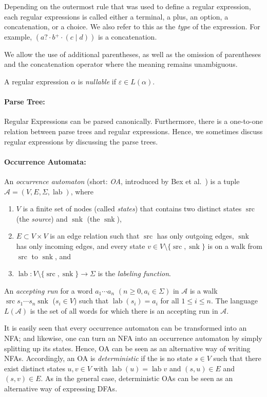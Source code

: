 \documentclass[a4paper,11pt, svgnames,titlepage]{article}
\newcommand{\rxp}{{^\mathtt{+}}}
\newcommand{\rxo}{\mathtt{?}}
\newcommand{\rxc}{\cdot}
\DeclareMathOperator{\ror}{\mathtt{|}}
\newcommand{\emptyword}{\varepsilon}
\DeclareMathOperator{\lab}{lab}
\DeclareMathOperator{\src}{src}
\DeclareMathOperator{\snk}{snk}
\begin{document}
Depending on the outermost rule that was used to define a regular expression, each regular expressions is called either a terminal, a plus, an option, a concatenation, or a choice. We also refer to this as the \emph{type} of the expression. For example, $(a\rxo \rxc b\rxp \rxc (c\ror d))$ is a concatenation.

We allow the use of additional parentheses, as well as the omission of parentheses and the concatenation operator where the meaning remains unambiguous.

A regular expression $\alpha$ is \emph{nullable} if $\emptyword\in L(\alpha)$.

\paragraph{Parse Tree:} Regular Expressions can be parsed canonically. Furthermore, there is a one-to-one relation between parse trees and regular expressions. Hence, we sometimes discuss regular expressions by discussing the parse trees.

\paragraph{Occurrence Automata:} An \emph{occurrence automaton} (short: \emph{OA}, introduced by Bex et al.~\cite{bex:kore}) is a tuple $\mathcal{A}=(V,E,\Sigma,\lab)$, where 
\begin{enumerate}
	\item $V$ is a finite set of nodes (called \emph{states}) that contains two distinct states $\src$ (the \emph{source}) and $\snk$ (the $\snk$),
	\item $E\subset V\times V$ is an edge relation such that $\src$ has only outgoing edges, $\snk$ has only incoming edges, and every state $v\in V\setminus\{\src,\snk\}$ is on a walk from $\src$ to $\snk$, and
	\item $\lab: V\setminus\{\src,\snk\} \to \Sigma $ is the \emph{labeling function}. 
\end{enumerate}
An \emph{accepting run} for a word $a_1 \cdots a_n$ $(n\geq 0, a_i\in\Sigma)$ in $\mathcal{A}$ is a walk $\src s_1 \cdots s_n \snk$ ($s_i\in V$) such that $\lab(s_i)=a_i$ for all $1\leq i \leq n$. The language $L(\mathcal{A})$ is the set of all words for which there is an accepting run in $\mathcal{A}$.

It is easily seen that every occurrence automaton can be transformed into an NFA; and likewise, one can turn an NFA into an occurrence automaton by simply splitting up its states. Hence, OA can be seen  as an alternative way of writing NFAs. Accordingly, an OA is \emph{deterministic} if the is no state $s\in V$ such that there exist distinct states $u,v\in V$ with $\lab(u)=\lab{v}$ and $(s,u)\in E$ and $(s,v)\in E$. As in the general case, deterministic OAs can be seen as an alternative way of expressing DFAs.
\end{document}
